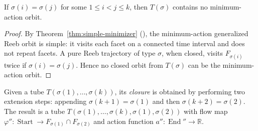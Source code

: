 \begin{lemma}\label{lem:prune-simple}
If $\sigma(i) = \sigma(j)$ for some $1 \leq i < j \leq k$,
then $T(\sigma)$ contains no minimum-action orbit.
\end{lemma}

\begin{proof}
By Theorem~\ref{thm:simple-minimizer} (\cite{HK2017}), the minimum-action generalized Reeb orbit is simple:
it visits each facet on a connected time interval and does not repeat facets.
A pure Reeb trajectory of type $\sigma$, when closed,
visits $F_{\sigma(i)}$ twice if $\sigma(i) = \sigma(j)$.
Hence no closed orbit from $T(\sigma)$ can be the minimum-action orbit.
\end{proof}

\begin{definition}\label{def:tube-close}
Given a tube $T(\sigma(1), \ldots, \sigma(k))$,
its \emph{closure} is obtained by performing two extension steps:
appending $\sigma(k+1) = \sigma(1)$ and then $\sigma(k+2) = \sigma(2)$.
The result is a tube $T(\sigma(1), \ldots, \sigma(k), \sigma(1), \sigma(2))$
with flow map $\varphi'' \colon \operatorname{Start} \to F_{\sigma(1)} \cap F_{\sigma(2)}$
and action function $a'' \colon \operatorname{End}'' \to \mathbb{R}$.
\end{definition}


